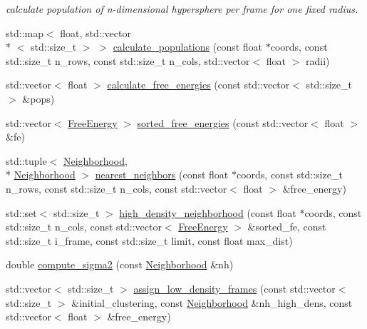 \begin{DoxyCompactItemize}
\begin{DoxyCompactList}\small\item\em calculate population of n-\/dimensional hypersphere per frame for one fixed radius. \end{DoxyCompactList}\item 
std\-::map$<$ float, std\-::vector\\*
$<$ std\-::size\-\_\-t $>$ $>$ \hyperlink{namespaceClustering_1_1Density_a1a709df0601b34b713d3fbb4a79e937c}{calculate\-\_\-populations} (const float $\ast$coords, const std\-::size\-\_\-t n\-\_\-rows, const std\-::size\-\_\-t n\-\_\-cols, std\-::vector$<$ float $>$ radii)
\item 
std\-::vector$<$ float $>$ \hyperlink{namespaceClustering_1_1Density_a9bc67a1fd0cfb678507e7f6eea991a48}{calculate\-\_\-free\-\_\-energies} (const std\-::vector$<$ std\-::size\-\_\-t $>$ \&pops)
\item 
std\-::vector$<$ \hyperlink{namespaceClustering_1_1Density_af77cfa169766fdc136b680121101496d}{Free\-Energy} $>$ \hyperlink{namespaceClustering_1_1Density_ab6c5ac7778d09db1fbd759e35338c7a4}{sorted\-\_\-free\-\_\-energies} (const std\-::vector$<$ float $>$ \&fe)
\item 
std\-::tuple$<$ \hyperlink{namespaceClustering_1_1Density_a23a99ccebc9d9cf5c9df6af14559d539}{Neighborhood}, \\*
\hyperlink{namespaceClustering_1_1Density_a23a99ccebc9d9cf5c9df6af14559d539}{Neighborhood} $>$ \hyperlink{namespaceClustering_1_1Density_a2ad6788d0b10b1560092a19394319e5c}{nearest\-\_\-neighbors} (const float $\ast$coords, const std\-::size\-\_\-t n\-\_\-rows, const std\-::size\-\_\-t n\-\_\-cols, const std\-::vector$<$ float $>$ \&free\-\_\-energy)
\item 
std\-::set$<$ std\-::size\-\_\-t $>$ \hyperlink{namespaceClustering_1_1Density_ae9451b462c1ce38ac2a5fb5da6538282}{high\-\_\-density\-\_\-neighborhood} (const float $\ast$coords, const std\-::size\-\_\-t n\-\_\-cols, const std\-::vector$<$ \hyperlink{namespaceClustering_1_1Density_af77cfa169766fdc136b680121101496d}{Free\-Energy} $>$ \&sorted\-\_\-fe, const std\-::size\-\_\-t i\-\_\-frame, const std\-::size\-\_\-t limit, const float max\-\_\-dist)
\item 
double \hyperlink{namespaceClustering_1_1Density_a92ef0c61760425c1c8ad5341d89b76a3}{compute\-\_\-sigma2} (const \hyperlink{namespaceClustering_1_1Density_a23a99ccebc9d9cf5c9df6af14559d539}{Neighborhood} \&nh)
\item 
std\-::vector$<$ std\-::size\-\_\-t $>$ \hyperlink{namespaceClustering_1_1Density_a96ffa5e84e38620f39293be0486e8ef9}{assign\-\_\-low\-\_\-density\-\_\-frames} (const std\-::vector$<$ std\-::size\-\_\-t $>$ \&initial\-\_\-clustering, const \hyperlink{namespaceClustering_1_1Density_a23a99ccebc9d9cf5c9df6af14559d539}{Neighborhood} \&nh\-\_\-high\-\_\-dens, const std\-::vector$<$ float $>$ \&free\-\_\-energy)

\end{DoxyCompactItemize}
